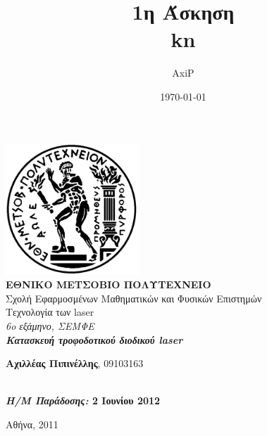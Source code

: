 \documentclass[a4paper,12pt,titlepage]{article}
\title{1η Άσκηση\\kn}
\author{AxiP}
\date{\today}
\begin{document}
\pagestyle{headings}    %

\begin{titlepage}
\begin{center}
\includegraphics[width=50mm]{pyrforos.pdf}\\[0.5cm]
\textbf{\LARGE ΕΘΝΙΚΟ ΜΕΤΣΟΒΙΟ ΠΟΛΥΤΕΧΝΕΙΟ}\\
\textrm{\Large Σχολή Εφαρμοσμένων Μαθηματικών και Φυσικών Επιστημών}\\[2.0cm]
\Huge{Τεχνολογία των laser\\}
\Large{\textit{6o εξάμηνο, ΣΕΜΦΕ}}\\[2.0cm]
\Large{\textit{\textbf{Κατασκευή τροφοδοτικού διοδικού laser}}}\\[5.0cm]
\normalsize

\begin{minipage}{0.49\textwidth}
\begin{flushleft}
\textbf{Αχιλλέας Πιπινέλλης}, 09103163
\end{flushleft}
\end{minipage}
\begin{minipage}{0.49\textwidth}
\begin{flushright}
\textbf{\\
\textit{Η/Μ Παράδοσης:} 2 Ιουνίου 2012}
\end{flushright}
\end{minipage}


\vfill
{Αθήνα, 2011}

\end{center}
\end{titlepage}
\end{document}
